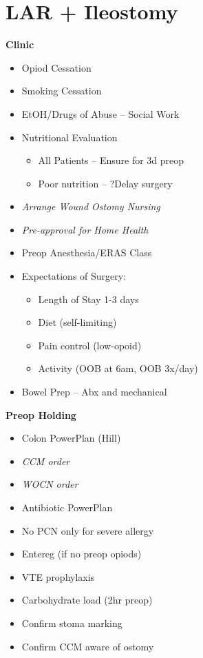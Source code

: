 \documentclass[
]{book}
\providecommand{\tightlist}{%
  \setlength{\itemsep}{0pt}\setlength{\parskip}{0pt}}
\begin{document}
\hypertarget{lar-ileostomy}{%
\chapter{LAR + Ileostomy}\label{lar-ileostomy}}

\textbf{Clinic}

\begin{itemize}
\tightlist
\item
  Opiod Cessation
\item
  Smoking Cessation
\item
  EtOH/Drugs of Abuse -- Social Work
\item
  Nutritional Evaluation

  \begin{itemize}
  \tightlist
  \item
    All Patients -- Ensure for 3d preop
  \item
    Poor nutrition -- ?Delay surgery
  \end{itemize}
\item
  \emph{Arrange Wound Ostomy Nursing}
\item
  \emph{Pre-approval for Home Health}
\item
  Preop Anesthesia/ERAS Class
\item
  Expectations of Surgery:

  \begin{itemize}
  \tightlist
  \item
    Length of Stay 1-3 days
  \item
    Diet (self-limiting)
  \item
    Pain control (low-opoid)
  \item
    Activity (OOB at 6am, OOB 3x/day)
  \end{itemize}
\item
  Bowel Prep -- Abx and mechanical
\end{itemize}

\textbf{Preop Holding}

\begin{itemize}
\tightlist
\item
  Colon PowerPlan (Hill)
\item
  \emph{CCM order}
\item
  \emph{WOCN order}
\item
  Antibiotic PowerPlan
\item
  No PCN only for severe allergy
\item
  Entereg (if no preop opiods)
\item
  VTE prophylaxis
\item
  Carbohydrate load (2hr preop)
\item
  Confirm stoma marking
\item
  Confirm CCM aware of ostomy
\end{itemize}
\end{document}
